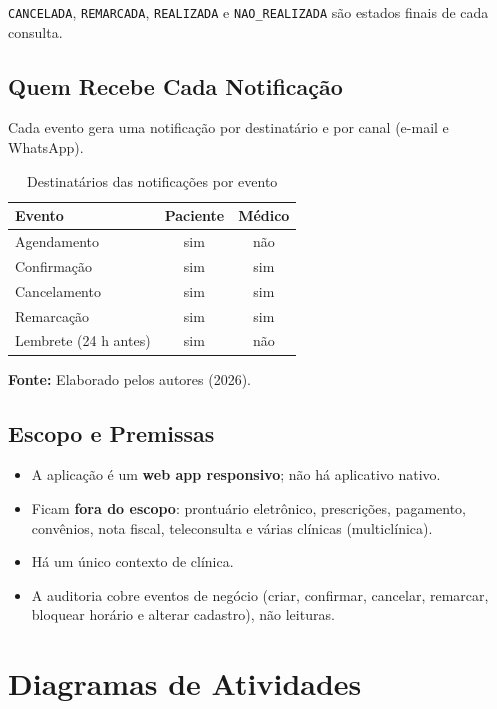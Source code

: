 \documentclass[12pt,a4paper]{article}
\newcommand{\fonte}[1]{%
  \par\vspace{2pt}%
  {\footnotesize\raggedright\textbf{Fonte:} #1\par}%
}
\providecommand{\tightlist}{%
  \setlength{\itemsep}{0pt}\setlength{\parskip}{0pt}}
\begin{document}
\texttt{CANCELADA}, \texttt{REMARCADA}, \texttt{REALIZADA} e
\texttt{NAO\_REALIZADA} são estados finais de cada consulta.

\newpage
\subsection{Quem Recebe Cada Notificação}\label{sec:notificacoes}

Cada evento gera uma notificação por destinatário e por canal (e-mail e
WhatsApp).

\begin{table}[H]
\centering
\caption{Destinatários das notificações por evento}
\label{qua:notificacoes}
{\footnotesize
\begin{tabularx}{\textwidth}{@{}>{\raggedright\arraybackslash}Xcc@{}}
\toprule
Evento & Paciente & Médico \\
\midrule
Agendamento & sim & não \\
Confirmação & sim & sim \\
Cancelamento & sim & sim \\
Remarcação & sim & sim \\
Lembrete (24 h antes) & sim & não \\
\bottomrule
\end{tabularx}
}
\fonte{Elaborado pelos autores (2026).}
\end{table}

\subsection{Escopo e Premissas}\label{sec:escopo}

\begin{itemize}
\tightlist
\item
  A aplicação é um \textbf{web app responsivo}; não há aplicativo
  nativo.
\item
  Ficam \textbf{fora do escopo}: prontuário eletrônico, prescrições,
  pagamento, convênios, nota fiscal, teleconsulta e várias clínicas
  (multiclínica).
\item
  Há um único contexto de clínica.
\item
  A auditoria cobre eventos de negócio (criar, confirmar, cancelar,
  remarcar, bloquear horário e alterar cadastro), não leituras.
\end{itemize}

\section{Diagramas de Atividades}\label{sec:atividades}
\end{document}
